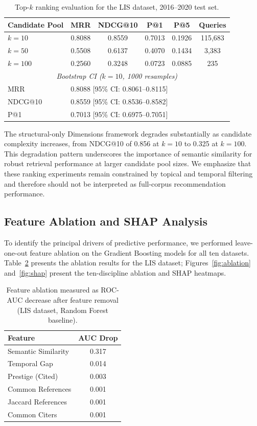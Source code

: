 \documentclass[11pt,a4paper]{article}
\begin{document}
\begin{table}[H]
\centering
\caption{Top-\(k\) ranking evaluation for the LIS dataset, 2016--2020 test set.}
\label{tab:ranking}
\begin{tabular}{lccccc}
\toprule
\textbf{Candidate Pool} & \textbf{MRR} & \textbf{NDCG@10} & \textbf{P@1} & \textbf{P@5} & \textbf{Queries} \\
\midrule
\(k=10\) & 0.8088 & 0.8559 & 0.7013 & 0.1926 & 115,683 \\
\(k=50\) & 0.5508 & 0.6137 & 0.4070 & 0.1434 & 3,383 \\
\(k=100\) & 0.2560 & 0.3248 & 0.0723 & 0.0885 & 235 \\
\midrule
\multicolumn{6}{c}{\textit{Bootstrap CI (\(k=10\), 1000 resamples)}} \\
MRR & \multicolumn{5}{l}{0.8088 [95\% CI: 0.8061--0.8115]} \\
NDCG@10 & \multicolumn{5}{l}{0.8559 [95\% CI: 0.8536--0.8582]} \\
P@1 & \multicolumn{5}{l}{0.7013 [95\% CI: 0.6975--0.7051]} \\
\bottomrule
\end{tabular}
\end{table}

The structural-only Dimensions framework degrades substantially as candidate complexity increases, from NDCG@10 of 0.856 at $k=10$ to 0.325 at $k=100$. This degradation pattern underscores the importance of semantic similarity for robust retrieval performance at larger candidate pool sizes. We emphasize that these ranking experiments remain constrained by topical and temporal filtering and therefore should not be interpreted as full-corpus recommendation performance.

\subsection{Feature Ablation and SHAP Analysis}
\label{sec:ablation}

To identify the principal drivers of predictive performance, we performed leave-one-out feature ablation on the Gradient Boosting models for all ten datasets. Table~\ref{tab:ablation_lis} presents the ablation results for the LIS dataset; Figures~\ref{fig:ablation} and~\ref{fig:shap} present the ten-discipline ablation and SHAP heatmaps.

\begin{table}[H]
\centering
\caption{Feature ablation measured as ROC-AUC decrease after feature removal (LIS dataset, Random Forest baseline).}
\label{tab:ablation_lis}
\begin{tabular}{lc}
\toprule
\textbf{Feature} & \textbf{AUC Drop} \\
\midrule
Semantic Similarity & 0.317 \\
Temporal Gap & 0.014 \\
Prestige (Cited) & 0.003 \\
Common References & 0.001 \\
Jaccard References & 0.001 \\
Common Citers & 0.001 \\
\bottomrule
\end{tabular}
\end{table}
\end{document}
